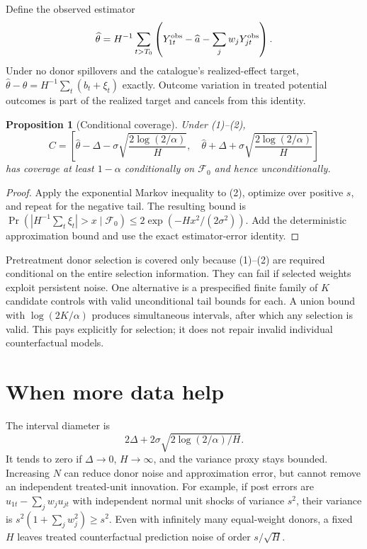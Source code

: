 \documentclass[11pt]{article}
\newtheorem{proposition}{Proposition}
\begin{document}
Define the observed estimator
\[
 \widehat\theta=H^{-1}\sum_{t>T_0}
 \left(Y_{1t}^{\rm obs}-\widehat a-\sum_jw_jY_{jt}^{\rm obs}\right).
\]
Under no donor spillovers and the catalogue's realized-effect target,
$\widehat\theta-\theta=H^{-1}\sum_t(b_t+\xi_t)$ exactly. Outcome variation in treated potential outcomes is part of the realized target and cancels from this identity.

\begin{proposition}[Conditional coverage]
Under (1)--(2),
\[
 C=\left[\widehat\theta-\Delta-
 \sigma\sqrt{\frac{2\log(2/\alpha)}H},\quad
 \widehat\theta+\Delta+
 \sigma\sqrt{\frac{2\log(2/\alpha)}H}\right]
\]
has coverage at least $1-\alpha$ conditionally on $\mathcal F_0$ and hence unconditionally.
\end{proposition}
\begin{proof}
Apply the exponential Markov inequality to (2), optimize over positive $s$, and repeat for the negative tail. The resulting bound is
$\Pr(|H^{-1}\sum_t\xi_t|>x\mid\mathcal F_0)\leq2\exp(-Hx^2/(2\sigma^2))$. Add the deterministic approximation bound and use the exact estimator-error identity.
\end{proof}

Pretreatment donor selection is covered only because (1)--(2) are required conditional on the entire selection information. They can fail if selected weights exploit persistent noise. One alternative is a prespecified finite family of $K$ candidate controls with valid unconditional tail bounds for each. A union bound with $\log(2K/\alpha)$ produces simultaneous intervals, after which any selection is valid. This pays explicitly for selection; it does not repair invalid individual counterfactual models.

\section*{When more data help}
The interval diameter is
\[
 2\Delta+2\sigma\sqrt{2\log(2/\alpha)/H}.
\]
It tends to zero if $\Delta\to0$, $H\to\infty$, and the variance proxy stays bounded. Increasing $N$ can reduce donor noise and approximation error, but cannot remove an independent treated-unit innovation. For example, if post errors are $u_{1t}-\sum_jw_ju_{jt}$ with independent normal unit shocks of variance $s^2$, their variance is $s^2(1+\sum_jw_j^2)\geq s^2$. Even with infinitely many equal-weight donors, a fixed $H$ leaves treated counterfactual prediction noise of order $s/\sqrt H$.
\end{document}
